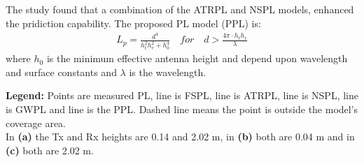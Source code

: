 \large

\begin{minipage}{.45\textwidth}
The study found that a combination of the ATRPL and NSPL models, enhanced the pridiction capability. The proposed PL model (PPL) is:
\vspace{-0.5em}\begin{align*}
L_p = \frac{d^4}{h_t^2 h_r^2+h_0^4}\quad for \quad d > \frac{4\pi\cdot h_th_r}{\lambda}
\end{align*}
where $h_0$ is the minimum effective antenna height and depend upon wavelength and surface constants and $\lambda$ is the wavelength.


\end{minipage}%
\hspace{1cm}
\begin{minipage}{0.45\textwidth}
\begin{center}

\end{center}
\end{minipage}

\vspace{0.5em}
\begin{minipage}{0.5\textwidth}
\begin{center}

\end{center}
\end{minipage}
\begin{minipage}{0.5\textwidth}
\begin{center}

\end{center}
\end{minipage}

\vspace{0.5em}
\textbf{Legend:} Points are measured PL, \textcolor{thomasblue}{line} is FSPL, \textcolor{thomasred}{line} is ATRPL, \textcolor{thomasgreen}{line} is NSPL, \textcolor{thomaspurple}{line} is GWPL and \textcolor{thomasyellow}{line} is the PPL. Dashed line means the point is outside the model's coverage area.\\
In \textbf{(a)} the Tx and Rx heights are 0.14 and 2.02 m, in \textbf{(b)} both are 0.04 m and in \textbf{(c)} both are 2.02 m.
